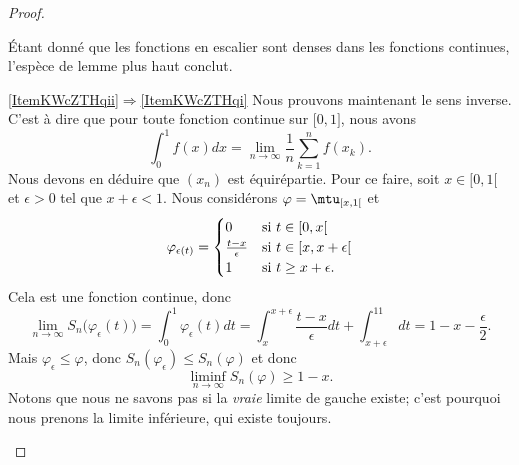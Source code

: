 \begin{proof}
\begin{subproof}
    Étant donné que les fonctions en escalier sont denses dans les fonctions continues, l'espèce de lemme plus haut conclut.
    
    \item[\ref{ItemKWcZTHqii}\( \Rightarrow\)\ref{ItemKWcZTHqi}]
    Nous prouvons maintenant le sens inverse. C'est à dire que pour toute fonction continue sur \( \mathopen[ 0 , 1 \mathclose]\), nous avons
    \begin{equation}
        \int_0^1f(x)dx=\lim_{n\to \infty} \frac{1}{ n }\sum_{k=1}^nf(x_k).
    \end{equation}
    Nous devons en déduire que \( (x_n)\) est équirépartie. Pour ce faire, soit \( x\in \mathopen[ 0 , 1 [\) et \( \epsilon>0\) tel que \( x+\epsilon<1\). Nous considérons \( \varphi=\mtu_{\mathopen[ x , 1 [}\) et
    \begin{equation}
        \varphi_{\epsilon(t)}=\begin{cases}
            0    &   \text{si \( t\in\mathopen[ 0 , x [\)}\\
            \frac{ t-x }{ \epsilon }    &   \text{si \( t\in \mathopen[ x , x+\epsilon [\)}\\
            1    &    \text{si \( t\geq x+\epsilon\)}.
        \end{cases}
    \end{equation}
    Cela est une fonction continue, donc
    \begin{equation}
        \lim_{n\to \infty} S_n\big( \varphi_{\epsilon}(t) \big)=\int_0^1\varphi_{\epsilon}(t)dt=\int_{x}^{x+\epsilon}\frac{ t-x }{ \epsilon }dt+\int_{x+\epsilon}^11dt=1-x-\frac{ \epsilon }{2}.
    \end{equation}
    Mais \( \varphi_{\epsilon}\leq \varphi\), donc \( S_n(\varphi_{\epsilon})\leq S_n(\varphi)\) et donc
    \begin{equation}
        \liminf_{n\to \infty}S_n(\varphi)\geq 1-x.
    \end{equation}
    Notons que nous ne savons pas si la \emph{vraie} limite de gauche existe; c'est pourquoi nous prenons la limite inférieure, qui existe toujours.


\end{subproof}
\end{proof}
